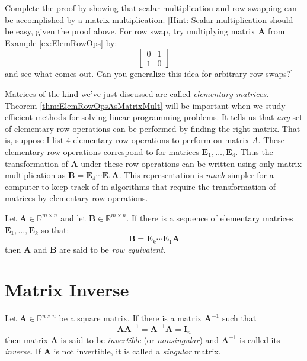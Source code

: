 \begin{exercise} Complete the proof by showing that scalar multiplication and row swapping can be accomplished by a matrix multiplication. [Hint: Scalar multiplication should be easy, given the proof above. For row swap, try multiplying matrix $\mathbf{A}$ from Example \ref{ex:ElemRowOps} by:
\begin{displaymath}
\begin{bmatrix}
0 & 1\\
1 & 0
\end{bmatrix}
\end{displaymath}
and see what comes out. Can you generalize this idea for arbitrary row swaps?]
\label{exer:ElemRowOpsAsMatrixMult}
\end{exercise}

Matrices of the kind we've just discussed are called \textit{elementary matrices}. Theorem \ref{thm:ElemRowOpsAsMatrixMult} will be important when we study efficient methods for solving linear programming problems. It tells us that \textit{any} set of elementary row operations can be performed by finding the right matrix. That is, suppose I list 4 elementary row operations to perform on matrix $A$. These elementary row operations correspond to for matrices $\mathbf{E}_1, \dots, \mathbf{E}_4$. Thus the transformation of $\mathbf{A}$ under these row operations can be written using only matrix multiplication as $\mathbf{B} = \mathbf{E}_4\cdots\mathbf{E}_1\mathbf{A}$. This representation is \textit{much} simpler for a computer to keep track of in algorithms that require the transformation of matrices by elementary row operations.

\begin{definition} Let $\mathbf{A} \in \mathbb{R}^{m \times n}$ and let $\mathbf{B} \in \mathbb{R}^{m \times n}$. If there is a sequence of elementary matrices $\mathbf{E}_1,\dots,\mathbf{E}_k$ so that:
\begin{displaymath}
\mathbf{B} = \mathbf{E}_k\cdots\mathbf{E}_1\mathbf{A}
\end{displaymath}
then $\mathbf{A}$ and $\mathbf{B}$ are said to be \textit{row equivalent}.
\end{definition}


\section{Matrix Inverse}
\begin{definition} Let $\mathbf{A} \in \mathbb{R}^{n \times n}$ be a square matrix. If there is a matrix $\mathbf{A}^{-1}$ such that
\begin{equation}
\mathbf{A} \mathbf{A}^{-1} = \mathbf{A}^{-1} \mathbf{A} = \mathbf{I}_n
\end{equation}
then matrix $\mathbf{A}$ is said to be \textit{invertible} (or \textit{nonsingular}) and $\mathbf{A}^{-1}$ is called its \textit{inverse}. If \textbf{A} is not invertible, it is called a \textit{singular} matrix.
\end{definition}

